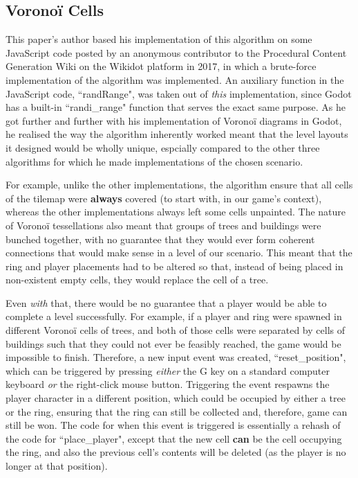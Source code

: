 \subsection{Voronoï Cells} \label{voronoi1}

This paper's author based his implementation of this algorithm on some JavaScript code posted by an anonymous contributor to the Procedural Content Generation Wiki on the Wikidot platform in 2017, in which a brute-force implementation of the algorithm was implemented.\cite{pcgwikivoronoi} An auxiliary function in the JavaScript code, ``randRange", was taken out of \textit{this} implementation, since Godot has a built-in ``randi\_range" function that serves the exact same purpose.\cite{gdscriptdocs} As he got further and further with his implementation of Voronoï diagrams in Godot, he realised the way the algorithm inherently worked meant that the level layouts it designed would be wholly unique, espcially compared to the other three algorithms for which he made implementations of the chosen scenario.

For example, unlike the other implementations, the algorithm ensure that all cells of the tilemap were \textbf{always} covered (to start with, in our game's context), whereas the other implementations always left some cells unpainted. The nature of Voronoï tessellations also meant that groups of trees and buildings were bunched together, with no guarantee that they would ever form coherent connections that would make sense in a level of our scenario. This meant that the ring and player placements had to be altered so that, instead of being placed in non-existent empty cells, they would replace the cell of a tree.

Even \textit{with} that, there would be no guarantee that a player would be able to complete a level successfully. For example, if a player and ring were spawned in different Voronoï cells of trees, and both of those cells were separated by cells of buildings such that they could not ever be feasibly reached, the game would be impossible to finish. Therefore, a new input event was created, ``reset\_position", which can be triggered by pressing \textit{either} the G key on a standard computer keyboard \textit{or} the right-click mouse button. Triggering the event respawns the player character in a different position, which could be occupied by either a tree or the ring, ensuring that the ring can still be collected and, therefore, game can still be won. The code for when this event is triggered is essentially a rehash of the code for ``place\_player", except that the new cell \textbf{can} be the cell occupying the ring, and also the previous cell's contents will be deleted (as the player is no longer at that position).

